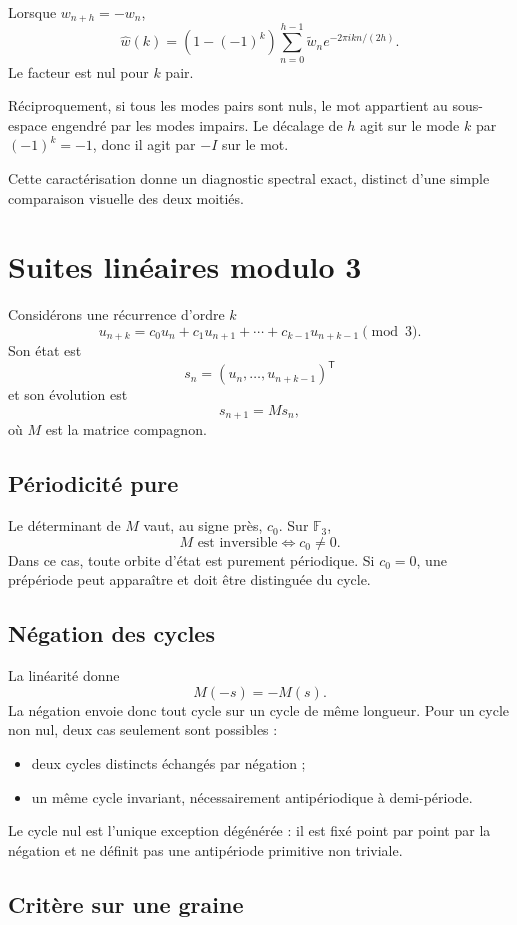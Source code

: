 \documentclass[11pt,a4paper]{article}
\newcommand{\F}{\mathbb F}
\begin{document}
Lorsque \(w_{n+h}=-w_n\),
\[
\widehat w(k)
=\left(1-(-1)^k\right)
\sum_{n=0}^{h-1}
\widetilde w_n e^{-2\pi i kn/(2h)}.
\]
Le facteur est nul pour \(k\) pair.

Réciproquement, si tous les modes pairs sont nuls, le mot appartient au
sous-espace engendré par les modes impairs. Le décalage de \(h\) agit sur
le mode \(k\) par \((-1)^k=-1\), donc il agit par \(-I\) sur le mot.

Cette caractérisation donne un diagnostic spectral exact, distinct d'une
simple comparaison visuelle des deux moitiés.

\section{Suites linéaires modulo 3}

Considérons une récurrence d'ordre \(k\)
\[
u_{n+k}
=c_0u_n+c_1u_{n+1}+\cdots+c_{k-1}u_{n+k-1}
\pmod3.
\]
Son état est
\[
s_n=(u_n,\ldots,u_{n+k-1})^{\mathsf T}
\]
et son évolution est
\[
s_{n+1}=Ms_n,
\]
où \(M\) est la matrice compagnon.

\subsection{Périodicité pure}

Le déterminant de \(M\) vaut, au signe près, \(c_0\). Sur \(\F_3\),
\[
M\text{ est inversible}
\iff c_0\neq0.
\]
Dans ce cas, toute orbite d'état est purement périodique. Si \(c_0=0\),
une prépériode peut apparaître et doit être distinguée du cycle.

\subsection{Négation des cycles}

La linéarité donne
\[
M(-s)=-M(s).
\]
La négation envoie donc tout cycle sur un cycle de même longueur. Pour un
cycle non nul, deux cas seulement sont possibles :
\begin{itemize}
\item deux cycles distincts échangés par négation ;
\item un même cycle invariant, nécessairement antipériodique à demi-période.
\end{itemize}
Le cycle nul est l'unique exception dégénérée : il est fixé point par point
par la négation et ne définit pas une antipériode primitive non triviale.

\subsection{Critère sur une graine}
\end{document}
